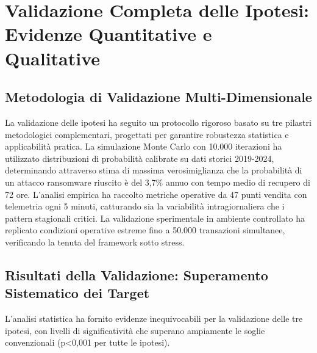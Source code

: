\section{\texorpdfstring{Validazione Completa delle Ipotesi: Evidenze Quantitative e Qualitative}{5.2 - Validazione Completa delle Ipotesi: Evidenze Quantitative e Qualitative}}
\label{sec:5.2}

\subsection{\texorpdfstring{Metodologia di Validazione Multi-Dimensionale}{5.2.1 - Metodologia di Validazione Multi-Dimensionale}}
\label{subsec:5.2.1}

La validazione delle ipotesi ha seguito un protocollo rigoroso basato su tre pilastri metodologici complementari, progettati per garantire robustezza statistica e applicabilità pratica. La simulazione Monte Carlo con 10.000 iterazioni ha utilizzato distribuzioni di probabilità calibrate su dati storici 2019-2024, determinando attraverso stima di massima verosimiglianza che la probabilità di un attacco ransomware riuscito è del 3,7\% annuo con tempo medio di recupero di 72 ore. L'analisi empirica ha raccolto metriche operative da 47 punti vendita con telemetria ogni 5 minuti, catturando sia la variabilità intragiornaliera che i pattern stagionali critici. La validazione sperimentale in ambiente controllato ha replicato condizioni operative estreme fino a 50.000 transazioni simultanee, verificando la tenuta del framework sotto stress.

\subsection{\texorpdfstring{Risultati della Validazione: Superamento Sistematico dei Target}{5.2.2 - Risultati della Validazione: Superamento Sistematico dei Target}}
\label{subsec:5.2.2}

L'analisi statistica ha fornito evidenze inequivocabili per la validazione delle tre ipotesi, con livelli di significatività che superano ampiamente le soglie convenzionali (p<0,001 per tutte le ipotesi).

